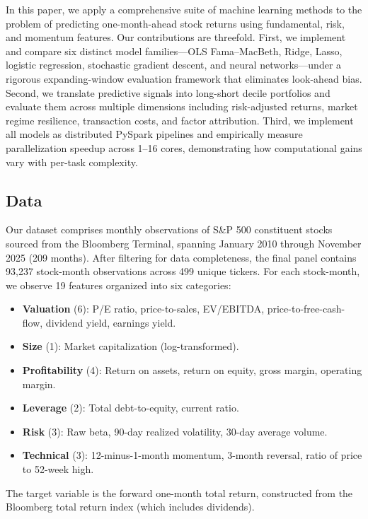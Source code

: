 \documentclass[11pt]{article}
\begin{document}
In this paper, we apply a comprehensive suite of machine learning methods to the problem of predicting one-month-ahead stock returns using fundamental, risk, and momentum features. Our contributions are threefold. First, we implement and compare six distinct model families---OLS Fama--MacBeth, Ridge, Lasso, logistic regression, stochastic gradient descent, and neural networks---under a rigorous expanding-window evaluation framework that eliminates look-ahead bias. Second, we translate predictive signals into long-short decile portfolios and evaluate them across multiple dimensions including risk-adjusted returns, market regime resilience, transaction costs, and factor attribution. Third, we implement all models as distributed PySpark pipelines and empirically measure parallelization speedup across 1--16 cores, demonstrating how computational gains vary with per-task complexity.

\subsection{Data}

Our dataset comprises monthly observations of S\&P 500 constituent stocks sourced from the Bloomberg Terminal, spanning January 2010 through November 2025 (209 months). After filtering for data completeness, the final panel contains 93{,}237 stock-month observations across 499 unique tickers. For each stock-month, we observe 19 features organized into six categories:

\begin{itemize}
    \item \textbf{Valuation} (6): P/E ratio, price-to-sales, EV/EBITDA, price-to-free-cash-flow, dividend yield, earnings yield.
    \item \textbf{Size} (1): Market capitalization (log-transformed).
    \item \textbf{Profitability} (4): Return on assets, return on equity, gross margin, operating margin.
    \item \textbf{Leverage} (2): Total debt-to-equity, current ratio.
    \item \textbf{Risk} (3): Raw beta, 90-day realized volatility, 30-day average volume.
    \item \textbf{Technical} (3): 12-minus-1-month momentum, 3-month reversal, ratio of price to 52-week high.
\end{itemize}

The target variable is the forward one-month total return, constructed from the Bloomberg total return index (which includes dividends).
\end{document}
